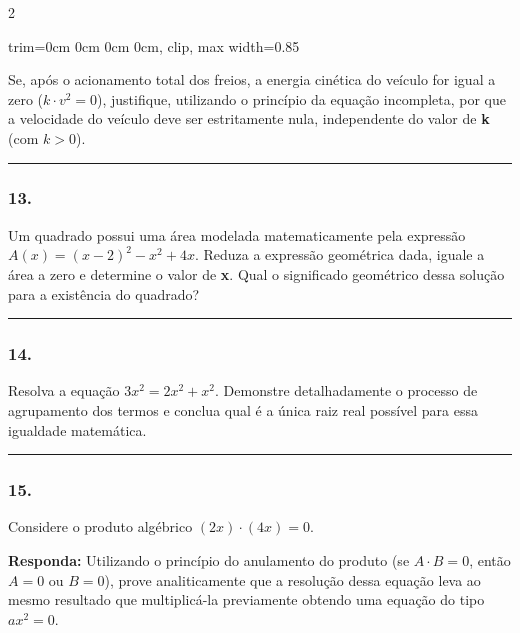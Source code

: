 \documentclass[twoside, 10pt, a4paper]{article}
\newlength{\espacoPreQuestao}\setlength{\espacoPreQuestao}{0.1cm}
\newlength{\espacoQuestao}\setlength{\espacoQuestao}{0.2cm}
\newcommand{\larguraTikz}{0.85\linewidth}
\begin{document}
\begin{multicols*}{2}
\begin{center}
\begin{adjustbox}{trim=0cm 0cm 0cm 0cm, clip, max width=\larguraTikz}
\end{adjustbox}
\end{center}

Se, após o acionamento total dos freios, a energia cinética do veículo for igual a zero ($ k \cdot v^2 = 0 $), justifique, utilizando o princípio da equação incompleta, por que a velocidade do veículo deve ser estritamente nula, independente do valor de \textbf{k} (com $ k > 0 $).
\par\vspace{\espacoQuestao}

\noindent\textcolor{CorLinha}{\rule{\linewidth}{0.5pt}} 
\par\vspace{\espacoPreQuestao}
\subsubsection*{13.} Um quadrado possui uma área modelada matematicamente pela expressão $ A(x) = (x - 2)^2 - x^2 + 4x $. Reduza a expressão geométrica dada, iguale a área a zero e determine o valor de \textbf{x}. Qual o significado geométrico dessa solução para a existência do quadrado?
\par\vspace{\espacoQuestao}

\noindent\textcolor{CorLinha}{\rule{\linewidth}{0.5pt}} 
\par\vspace{\espacoPreQuestao}
\subsubsection*{14.} Resolva a equação $ 3x^2 = 2x^2 + x^2 $. Demonstre detalhadamente o processo de agrupamento dos termos e conclua qual é a única raiz real possível para essa igualdade matemática.
\par\vspace{\espacoQuestao}

\noindent\textcolor{CorLinha}{\rule{\linewidth}{0.5pt}} 
\par\vspace{\espacoPreQuestao}
\subsubsection*{15.} Considere o produto algébrico $ (2x) \cdot (4x) = 0 $. 
\begin{boxresponda}
\textbf{Responda:} Utilizando o princípio do anulamento do produto (se $ A \cdot B = 0 $, então $ A = 0 $ ou $ B = 0 $), prove analiticamente que a resolução dessa equação leva ao mesmo resultado que multiplicá-la previamente obtendo uma equação do tipo $ ax^2 = 0 $.
\end{boxresponda}
\par\vspace{\espacoQuestao}

\end{multicols*}
\end{document}
